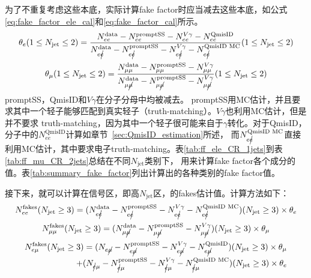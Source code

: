 为了不重复考虑这些本底，实际计算fake factor时应当减去这些本底，如公式\ref{eq:fake_factor_ele_cal}和\ref{eq:fake_factor_cal}所示。
\begin{equation}
\theta_{e}(1\leq N_{\text{jet}}\leq 2)=\frac{N_{ee}^{\text{data}}-N_{ee}^{\text{promptSS}}-N_{ee}^{V\gamma}-N_{ee}^{\text{QmisID}}}{N_{e\cancel{e}}^{\text{data}}-N_{e\cancel{e}}^{\text{promptSS}}-N_{e\cancel{e}}^{V\gamma}-N_{e\cancel{e}}^{\text{QmisID MC}}}(1\leq N_{\text{jet}}\leq 2)
\label{eq:fake_factor_ele_cal}
\end{equation}
\begin{equation}
\theta_{\mu}(1\leq N_{\text{jet}}\leq 2)=\frac{N_{\mu\mu}^{\text{data}}-N_{\mu\mu}^{\text{promptSS}}-N_{\mu\mu}^{V\gamma}}{N_{\mu\cancel{\mu}}^{\text{data}}-N_{\mu\cancel{\mu}}^{\text{promptSS}}-N_{\mu\cancel{\mu}}^{V\gamma}}(1\leq N_{\text{jet}}\leq 2)
\label{eq:fake_factor_cal}
\end{equation}
promptSS，QmisID和$V\gamma$在分子分母中均被减去。
promptSS用MC估计，并且要求其中一个轻子能够匹配到真实轻子（truth-matching）。$V\gamma$也利用MC估计，但是并不要求
truth-matching，因为其中一个轻子很可能来自于$\gamma$转化。对于QmisID，分子中的$N_{ee}^{\text{QmisID}}$计算如章节~\ref{sec:QmisID_estimation}所述，
而$N_{e\cancel{e}}^{\text{QmisID MC}}$直接利用MC估计，其中要求电子truth-matching。表\ref{tab:ff_ele_CR_1jets}到表\ref{tab:ff_mu_CR_2jets}总结在不同$N_{\text{jet}}$类别下，
用来计算fake factor各个成分的值。表\ref{tab:summary_fake_factor}列出计算出的各种类别的fake factor值。



\clearpage
接下来，就可以计算在信号区，即高$N_{\text{jet}}$区，的fakes估计值。计算方法如下：
\begin{equation}
N_{ee}^{\text{fakes}}(N_{\text{jet}}\geq 3)=(N_{e\cancel{e}}^{\text{data}}-N_{e\cancel{e}}^{\text{promptSS}}-N_{e\cancel{e}}^{V\gamma}-N_{e\cancel{e}}^{\text{QmisID MC}})(N_{\text{jet}}\geq 3)\times \theta_{e}
\end{equation}
\begin{equation}
N_{\mu\mu}^{\text{fakes}}(N_{\text{jet}}\geq 3)=(N_{\mu\cancel{\mu}}^{\text{data}}-N_{\mu\cancel{\mu}}^{\text{promptSS}}-N_{\mu\cancel{\mu}}^{V\gamma})(N_{\text{jet}}\geq 3)\times \theta_{\mu}
\end{equation}
\begin{equation}
\begin{split}
N_{e\mu}^{\text{fakes}}(N_{\text{jet}}\geq 3)=(N_{e\cancel{\mu}}-N_{e\cancel{\mu}}^{\text{promptSS}}-N_{e\cancel{\mu}}^{V\gamma}-N_{e\cancel{\mu}}^{\text{QmisID}})(N_{\text{jet}}\geq 3)\times \theta_{\mu} \\ +
       (N_{\cancel{e}\mu}-N_{\cancel{e}\mu}^{\text{promptSS}}-N_{\cancel{e}\mu}^{V\gamma}-N_{\cancel{e}\mu}^{\text{QmisID MC}})(N_{\text{jet}}\geq 3)\times \theta_{e}
\end{split}
\end{equation}
